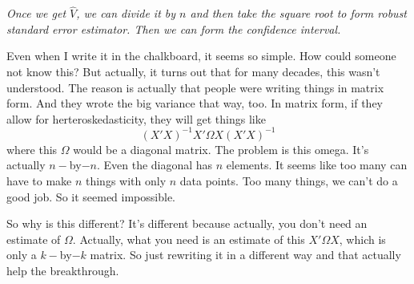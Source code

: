 \documentclass[11pt,a4paper]{amsart}
\theoremstyle{plain}
\theoremstyle{definition}
\begin{document}
		    \emph{Once we get $\hat{V}$, we can divide it by $n$ and then take the square root to form robust standard error estimator. Then we can form the confidence interval.}\par 
	   		 Even when I write it in the chalkboard, it seems so simple.  How could someone not know this? But actually, it turns out that for many decades, this wasn't understood. The reason is actually that people were writing things in matrix form.  And they wrote the big variance that way, too. In matrix form, if they allow for herteroskedasticity, they will get things like 
	   		 \[	(X'X)^{-1}X' \Omega X (X'X)^{-1}	\]
	   		 where this $\Omega$ would be a diagonal matrix. The problem is this omega. It's actually $n-$by$-n$. Even the diagonal has $n$ elements. It seems like too many can have to make $n$ things with only $n$ data points. Too many things, we can't do a good job. So it seemed impossible.\par 
	   		 So why is this different? It's different because actually, you don't need an estimate of $\Omega$. Actually, what you need is an estimate of this $X' \Omega X$, which is only a $k-$by$-k$ matrix. So just rewriting it in a different way and that actually help the breakthrough.
	   		 
\end{document}
